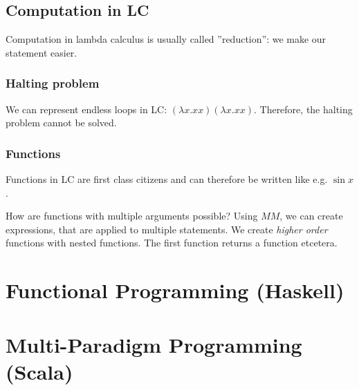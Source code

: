 \subsection{Computation in LC}
Computation in lambda calculus is usually called ''reduction'': we make our statement easier.

\subsubsection{Halting problem}

We can represent endless loops in LC: $(\lambda x. x x) (\lambda x . x x)$. Therefore, the halting problem cannot be solved.

\subsubsection{Functions}

Functions in LC are first class citizens and can therefore be written like e.g. $\sin x$.

How are functions with multiple arguments possible? Using $M M$, we can create expressions, that are applied to multiple statements. We create \emph{higher order} functions with nested functions. The first function returns a function etcetera.




\section{Functional Programming (Haskell)}

\section{Multi-Paradigm Programming (Scala)}




